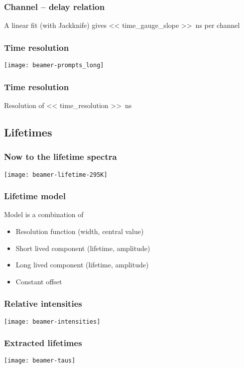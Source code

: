 \documentclass[english, fleqn]{beamer}
\begin{document}
\begin{frame}
    \frametitle{Channel -- delay relation}

    A linear fit (with Jackknife) gives
    \SI{<< time_gauge_slope >>}{\nano\second} per channel
\end{frame}


\begin{frame}
    \frametitle{Time resolution}

    \centering
    \texttt{[image: beamer-prompts\_long]}
\end{frame}

\begin{frame}
    \frametitle{Time resolution}

    Resolution of \SI{<< time_resolution >>}{\nano\second}
\end{frame}

\subsection{Lifetimes}

\begin{frame}
    \frametitle{Now to the lifetime spectra}
    
    \centering
    \texttt{[image: beamer-lifetime-295K]}
\end{frame}

\begin{frame}
    \frametitle{Lifetime model}

    Model is a combination of
    \begin{itemize}
        \item Resolution function (width, central value)
        \item Short lived component (lifetime, amplitude)
        \item Long lived component (lifetime, amplitude)
        \item Constant offset
    \end{itemize}
\end{frame}

\begin{frame}
    \frametitle{Relative intensities}

    \centering
    \texttt{[image: beamer-intensities]}
\end{frame}

\begin{frame}
    \frametitle{Extracted lifetimes}

    \centering
    \texttt{[image: beamer-taus]}
\end{frame}
\end{document}
